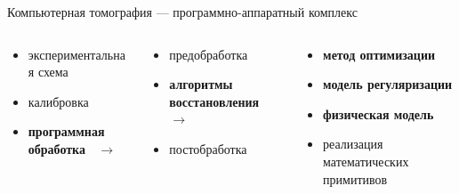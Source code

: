 \begin{frame}
Компьютерная томография --- программно-аппаратный комплекс
\setlength{\leftmargini}{0em}
\begin{columns}[T,onlytextwidth]
  \begin{column}{.4\textwidth}
  \begin{itemize}
    \item экспериментальная схема
    \item калибровка 
    \item \textbf{программная обработка \ $\rightarrow$}
  \end{itemize}
  \end{column}
  \pause
  \begin{column}[t]{0.4\linewidth}
  \begin{itemize}
    \item предобработка
    \item \textbf{алгоритмы восстановления \ $\rightarrow$}
    \item постобработка
  \end{itemize}
  \end{column}
  \pause
  \begin{column}[t]{0.35\linewidth}
  \begin{itemize}
    \item \textbf{метод оптимизации}
    \item \textbf{модель регуляризации}
    \item \textbf{физическая модель}
    \item реализация математических примитивов
  \end{itemize}
  \end{column}
\end{columns}
\end{frame}
\endgroup